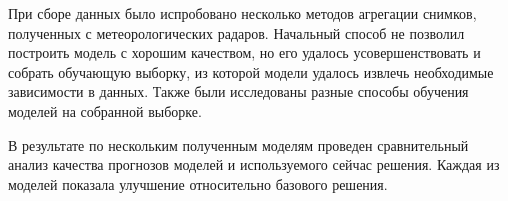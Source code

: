 \documentclass[14pt]{matmex-diploma}
\begin{document}
При сборе данных было испробовано несколько методов агрегации снимков, полученных с метеорологических радаров. Начальный способ не позволил построить модель с хорошим качеством, но его удалось усовершенствовать и собрать обучающую выборку, из которой модели удалось извлечь необходимые зависимости в данных. Также были исследованы разные способы обучения моделей на собранной выборке. 

В результате по нескольким полученным моделям проведен сравнительный анализ качества прогнозов моделей и используемого сейчас решения. Каждая из моделей показала улучшение относительно базового решения.







\setmonofont[Mapping=tex-text]{CMU Typewriter Text}

 
\end{document}

